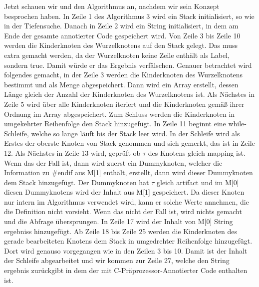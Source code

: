 Jetzt schauen wir und den Algorithmus an, nachdem wir sein Konzept besprochen haben. In Zeile 1 des Algorithmus 3 wird ein Stack initialisiert, so wie in der Tiefensuche. Danach in Zeile 2 wird ein String initialisiert, in dem am Ende der gesamte annotierter Code gespeichert wird. Von Zeile 3 bis Zeile 10 werden die Kinderknoten des Wurzelknotens auf den Stack gelegt. Das muss extra gemacht werden, da der Wurzelknoten keine Zeile enthält als Label, sondern true. Damit würde er das Ergebnis verfälschen. Genauer betrachtet wird folgendes gemacht, in der Zeile 3 werden die Kinderknoten des Wurzelknotens bestimmt und als Menge abgespeichert. Dann wird ein Array erstellt, dessen Länge gleich der Anzahl der Kinderknoten des Wurzelknotens ist. Als Nächstes in Zeile 5 wird über alle Kinderknoten iteriert und die Kinderknoten gemäß ihrer Ordnung im Array abgespeichert. Zum Schluss werden die Kinderknoten in umgekehrter Reihenfolge den Stack hinzugefügt. In Zeile 11 beginnt eine while-Schleife, welche so lange läuft bis der Stack leer wird. In der Schleife wird als Erstes der oberste Knoten von Stack genommen und sich gemerkt, das ist in Zeile 12. Als Nächstes in Zeile 13 wird, geprüft ob $\tau$ des Knotens gleich mapping ist. Wenn das der Fall ist, dann wird zuerst ein Dummyknoten, welcher die Information zu \#endif aus M[1] enthält, erstellt, dann wird dieser Dummyknoten dem Stack hinzugefügt. Der Dummyknoten hat $\tau$ gleich artifact und im M[0] diesen Dummyknotens wird der Inhalt aus M[1] gespeichert. Da dieser Knoten nur intern im Algorithmus verwendet wird, kann er solche Werte annehmen, die die Definition nicht vorsieht. Wenn das nicht der Fall ist, wird nichts gemacht und die Abfrage übersprungen. In Zeile 17 wird der Inhalt von M[0] String \glqq ergebniss\grqq{} hinzugefügt. Ab Zeile 18 bis Zeile 25 werden die Kinderknoten des gerade bearbeiteten Knotens dem Stack in umgedrehter Reihenfolge hinzugefügt. Dort wird genauso vorgegangen wie in den Zeilen 3 bis 10. Damit ist der Inhalt der Schleife abgearbeitet und wir kommen zur Zeile 27, welche den String \glqq ergebnis\grqq{} zurückgibt in dem der mit C-Präprozessor-Annotierter Code enthalten ist.

